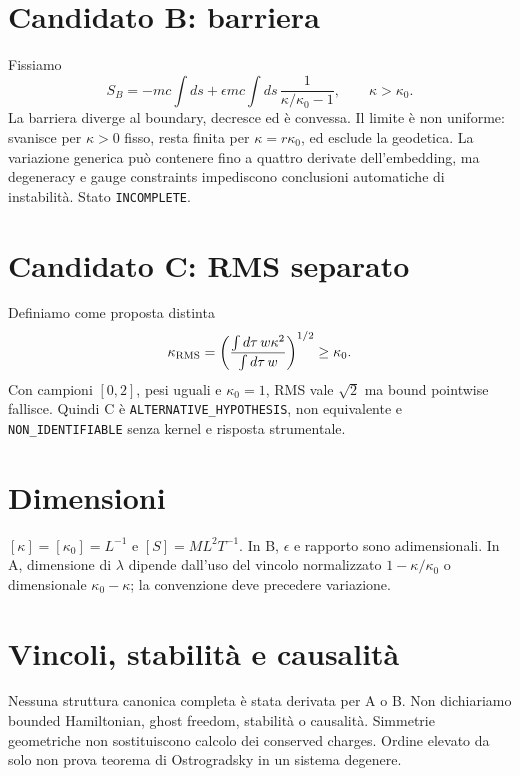 \documentclass[11pt,a4paper]{article}
\begin{document}
\section{Candidato B: barriera}\label{sec:p2-b}
Fissiamo
\begin{equation}\label{eq:p2-barrier}
S_B=-mc\int ds+\epsilon mc\int ds\,\frac{1}{\kappa/\kappa_0-1},
\qquad \kappa>\kappa_0.
\end{equation}
La barriera diverge al boundary, decresce ed è convessa. Il limite è non uniforme: svanisce per $\kappa>0$ fisso, resta finita per $\kappa=r\kappa_0$, ed esclude la geodetica. La variazione generica può contenere fino a quattro derivate dell'embedding, ma degeneracy e gauge constraints impediscono conclusioni automatiche di instabilità. Stato \texttt{INCOMPLETE}.

\section{Candidato C: RMS separato}\label{sec:p2-c}
Definiamo come proposta distinta
\begin{equation}\label{eq:p2-rms}
\kappa_{\rm RMS}=\left(\frac{\int d\tau\,w\kappa^2}{\int d\tau\,w}\right)^{1/2}\ge\kappa_0.
\end{equation}
Con campioni $[0,2]$, pesi uguali e $\kappa_0=1$, RMS vale $\sqrt2$ ma bound pointwise fallisce. Quindi C è \texttt{ALTERNATIVE\_HYPOTHESIS}, non equivalente e \texttt{NON\_IDENTIFIABLE} senza kernel e risposta strumentale.

\section{Dimensioni}\label{sec:p2-dimensions}
$[\kappa]=[\kappa_0]=L^{-1}$ e $[S]=ML^2T^{-1}$. In B, $\epsilon$ e rapporto sono adimensionali. In A, dimensione di $\lambda$ dipende dall'uso del vincolo normalizzato $1-\kappa/\kappa_0$ o dimensionale $\kappa_0-\kappa$; la convenzione deve precedere variazione.

\section{Vincoli, stabilità e causalità}\label{sec:p2-stability}
Nessuna struttura canonica completa è stata derivata per A o B. Non dichiariamo bounded Hamiltonian, ghost freedom, stabilità o causalità. Simmetrie geometriche non sostituiscono calcolo dei conserved charges. Ordine elevato da solo non prova teorema di Ostrogradsky in un sistema degenere.
\end{document}
